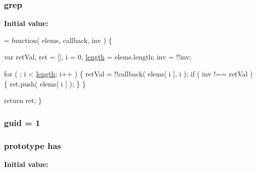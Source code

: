 \hypertarget{jquery-1_810_82-vsdoc_8js_ae68047c53cf0b4906eb8f3256d860435}{
\subsubsection[{grep}]{ grep}}\label{jquery-1_810_82-vsdoc_8js_ae68047c53cf0b4906eb8f3256d860435}
{\bfseries Initial value\-:}
\begin{DoxyCode}
= \textcolor{keyword}{function}( elems, callback, inv ) \{


        var retVal,
            ret = [],
            i = 0,
            \hyperlink{jquery-1_810_82-vsdoc_8js_aa7de35d58da66d9944ab9cbe82c19640}{length} = elems.length;
        inv = !!inv;

        
        
        \textcolor{keywordflow}{for} ( ; i < \hyperlink{jquery-1_810_82-vsdoc_8js_aa7de35d58da66d9944ab9cbe82c19640}{length}; i++ ) \{
            retVal = !!callback( elems[ i ], i );
            \textcolor{keywordflow}{if} ( inv !== retVal ) \{
                ret.push( elems[ i ] );
            \}
        \}

        \textcolor{keywordflow}{return} ret;
    \}
\end{DoxyCode}
\hypertarget{jquery-1_810_82-vsdoc_8js_a15bc7663c428889bacadc7aec13400cc}{
\subsubsection[{guid}]{ guid = 1}}\label{jquery-1_810_82-vsdoc_8js_a15bc7663c428889bacadc7aec13400cc}
\hypertarget{jquery-1_810_82-vsdoc_8js_a3976525435f2cc0ddbdfd1fd4fa719ec}{
\subsubsection[{has}]{ {\bf prototype} has}}\label{jquery-1_810_82-vsdoc_8js_a3976525435f2cc0ddbdfd1fd4fa719ec}
{\bfseries Initial value\-:}
